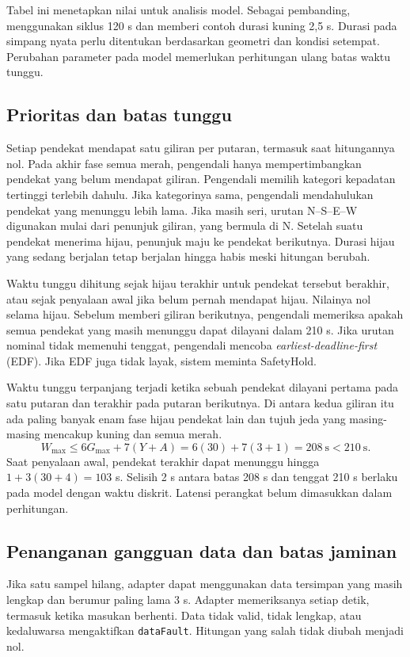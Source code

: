 Tabel ini menetapkan nilai untuk analisis model. Sebagai pembanding, \textcite{mondal2022} menggunakan siklus 120 s dan memberi contoh durasi kuning 2,5 s. Durasi pada simpang nyata perlu ditentukan berdasarkan geometri dan kondisi setempat. Perubahan parameter pada model memerlukan perhitungan ulang batas waktu tunggu.

\subsection{Prioritas dan batas tunggu}
Setiap pendekat mendapat satu giliran per putaran, termasuk saat hitungannya nol. Pada akhir fase semua merah, pengendali hanya mempertimbangkan pendekat yang belum mendapat giliran. Pengendali memilih kategori kepadatan tertinggi terlebih dahulu. Jika kategorinya sama, pengendali mendahulukan pendekat yang menunggu lebih lama. Jika masih seri, urutan N--S--E--W digunakan mulai dari penunjuk giliran, yang bermula di N. Setelah suatu pendekat menerima hijau, penunjuk maju ke pendekat berikutnya. Durasi hijau yang sedang berjalan tetap berjalan hingga habis meski hitungan berubah.

Waktu tunggu dihitung sejak hijau terakhir untuk pendekat tersebut berakhir, atau sejak penyalaan awal jika belum pernah mendapat hijau. Nilainya nol selama hijau. Sebelum memberi giliran berikutnya, pengendali memeriksa apakah semua pendekat yang masih menunggu dapat dilayani dalam 210 s. Jika urutan nominal tidak memenuhi tenggat, pengendali mencoba \textit{earliest-deadline-first} (EDF). Jika EDF juga tidak layak, sistem meminta SafetyHold.

Waktu tunggu terpanjang terjadi ketika sebuah pendekat dilayani pertama pada satu putaran dan terakhir pada putaran berikutnya. Di antara kedua giliran itu ada paling banyak enam fase hijau pendekat lain dan tujuh jeda yang masing-masing mencakup kuning dan semua merah.
\begin{equation}\label{eq:bound}
W_{\max}\leq 6G_{\max}+7(Y+A)=6(30)+7(3+1)=208\ \mathrm{s}<210\ \mathrm{s}.
\end{equation}
Saat penyalaan awal, pendekat terakhir dapat menunggu hingga $1+3(30+4)=103$ s. Selisih 2 s antara batas 208 s dan tenggat 210 s berlaku pada model dengan waktu diskrit. Latensi perangkat belum dimasukkan dalam perhitungan.

\subsection{Penanganan gangguan data dan batas jaminan}
Jika satu sampel hilang, adapter dapat menggunakan data tersimpan yang masih lengkap dan berumur paling lama 3 s. Adapter memeriksanya setiap detik, termasuk ketika masukan berhenti. Data tidak valid, tidak lengkap, atau kedaluwarsa mengaktifkan \texttt{dataFault}. Hitungan yang salah tidak diubah menjadi nol.

